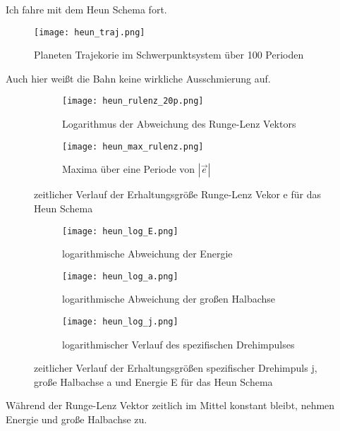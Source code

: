 \documentclass[12pt]{article}
\begin{document}
Ich fahre mit dem Heun Schema fort.
\begin{figure}[H]\centering\texttt{[image: heun\_traj.png]}\caption{Planeten Trajekorie im Schwerpunktsystem über 100 Perioden}\end{figure}
Auch hier weißt die Bahn keine wirkliche Ausschmierung auf. 
\begin{figure}[H]
    \hspace*{-1.5cm}
    \begin{subfigure}{0.4\textwidth}
    \texttt{[image: heun\_rulenz\_20p.png]}
    \caption{Logarithmus der Abweichung des Runge-Lenz Vektors}
    \end{subfigure}
    \hfill
    \begin{subfigure}{0.4\textwidth}
    \hspace*{-0.8cm}
    \texttt{[image: heun\_max\_rulenz.png]}
    \caption{Maxima über eine Periode von $|\vec{e}|$}
    \end{subfigure}
    \hfill
    \caption{zeitlicher Verlauf der Erhaltungsgröße Runge-Lenz Vekor e für das Heun Schema}\end{figure}

    \begin{figure}
    \hspace*{-1.5cm}
    \begin{subfigure}{0.4\textwidth}
    \texttt{[image: heun\_log\_E.png]}
    \caption{logarithmische Abweichung der Energie}
    \end{subfigure}
    \hfill
    \begin{subfigure}{0.4\textwidth}
    \hspace*{-0.8cm}
    \texttt{[image: heun\_log\_a.png]}
    \caption{logarithmische Abweichung der großen Halbachse}
    \end{subfigure}
    \hfill
    \hspace*{-1.5cm}
    \begin{subfigure}{0.4\textwidth}
    \texttt{[image: heun\_log\_j.png]}
    \caption{logarithmischer Verlauf des spezifischen Drehimpulses}
    \end{subfigure}
    \hfill
    \caption{zeitlicher Verlauf der Erhaltungsgrößen spezifischer Drehimpuls j, große Halbachse a und Energie E für das Heun Schema}\end{figure}
Während der Runge-Lenz Vektor zeitlich im Mittel konstant bleibt, nehmen Energie und große Halbachse zu.\newline\newline
\end{document}
